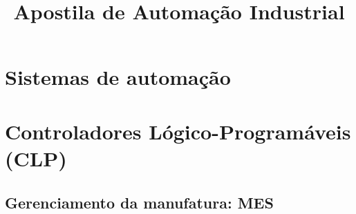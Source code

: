 \documentclass[12pt,oneside]{report}
\title{Apostila de Automação Industrial}
\begin{document}
\maketitle
\tableofcontents
\chapter{Sistemas de automação}



\chapter{Controladores Lógico-Programáveis (CLP)}









\section{Gerenciamento da manufatura: MES}

\end{document}
